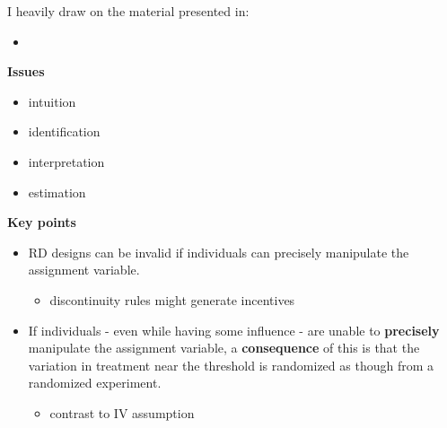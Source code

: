 \begin{frame} I heavily draw on the material presented in:

\begin{itemize}
\item {}
\end{itemize}

\end{frame}
\begin{frame}\textbf{Issues}\vspace{0.3cm}
\begin{itemize}\setlength\itemsep{1em}
\item intuition
\item identification
\item interpretation
\item estimation
\end{itemize}

\end{frame}
\begin{frame}\textbf{Key points}\vspace{0.3cm}

\begin{itemize}\setlength\itemsep{1em}
\item RD designs can be invalid if individuals can precisely manipulate the assignment variable.
  \begin{itemize}\medskip
  \item discontinuity rules might generate incentives
  \end{itemize}
\item If individuals - even while having some influence - are unable to \textbf{precisely} manipulate the assignment variable, a \textbf{consequence} of this is that the variation in treatment near the threshold is randomized as though from a randomized experiment.
  \begin{itemize}\medskip
  \item contrast to IV assumption
  \end{itemize}
\end{itemize}
\end{frame}
